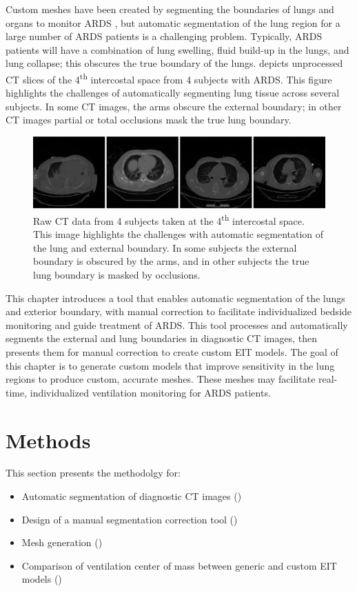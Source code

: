 Custom meshes have been created by segmenting the boundaries of lungs and organs
to monitor ARDS \parencite{yang_lung_2021}, but automatic segmentation of the lung region 
for a large number of ARDS patients is a challenging problem. Typically, ARDS patients 
will have a combination of
lung swelling, fluid build-up in the lungs, and lung collapse; this
obscures the 
true boundary of the lungs.  depicts unprocessed CT slices 
of the 4\textsuperscript{th} intercostal space from 4 subjects with
ARDS. This figure highlights the challenges  of automatically 
segmenting lung tissue across several subjects. 
In some CT images, the arms obscure the external boundary; in other 
CT images partial or total occlusions 
mask the true lung boundary.

\begin{figure}[H]
	\centering
	\includegraphics[width=\textwidth]{chapter5-CT_to_mesh/imgs/raw_ct_imgs.png}
	\caption[Raw CT images at the 4\textsuperscript{th} intersoctal space]{\label{fig:raw-ct}%
	Raw CT data from 4 subjects  taken at the 4\textsuperscript{th} intercostal space.
	This image highlights the challenges with automatic segmentation of the lung and external boundary. 
	In some subjects the external boundary is obscured by the arms, and in other subjects the 
	true lung boundary is masked by occlusions.
	}
\end{figure}

This chapter introduces a tool that enables automatic segmentation 
of the lungs and exterior boundary, with manual correction to facilitate individualized
bedside monitoring and guide treatment of ARDS.
This tool processes and automatically segments the external and lung boundaries 
in diagnostic CT images, 
then presents them for manual correction 
to create custom EIT models. 
The goal of this chapter is to generate custom models that improve sensitivity 
in the lung regions to produce custom, accurate 
meshes. 
These meshes may facilitate real-time, individualized ventilation
monitoring for ARDS patients.  

\section{Methods}
This section presents the methodolgy for:
\begin{itemize}
	\item Automatic segmentation of diagnostic CT images ()
	\item Design of a manual segmentation correction tool ()
	\item Mesh generation ()
	\item Comparison of ventilation center of mass 
	between generic and custom EIT models ()
\end{itemize}

